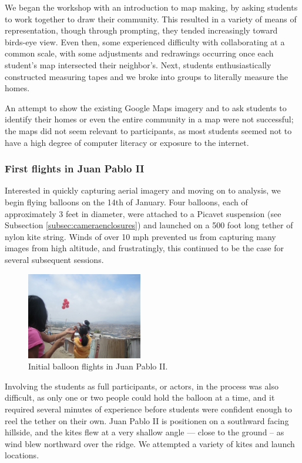 \documentclass[11pt,oneside,notitlepage]{report}
\begin{document}
We began the workshop with an introduction to map making, by asking students to work together to draw their community. This resulted in a variety of means of representation, though through prompting, they tended increasingly toward birds-eye view. Even then, some experienced difficulty with collaborating at a common scale, with some adjustments and redrawings occurring once each student's map intersected their neighbor's. Next, students enthusiastically constructed measuring tapes and we broke into groups to literally measure the homes. 

An attempt to show the existing Google Maps imagery and to ask students to identify their homes or even the entire community in a map were not successful; the maps did not seem relevant to participants, as most students seemed not to have a high degree of computer literacy or exposure to the internet. 

\subsubsection{First flights in Juan Pablo II}

Interested in quickly capturing aerial imagery and moving on to analysis, we begin flying balloons on the 14th of January. Four balloons, each of approximately 3 feet in diameter, were attached to a Picavet suspension (see Subsection \ref{subsec:cameraenclosures}) and launched on a 500 foot long tether of nylon kite string. Winds of over 10 mph prevented us from capturing many images from high altitude, and frustratingly, this continued to be the case for several subsequent sessions. 

\begin{figure}
	\begin{flushright}
		\includegraphics[width=0.45\textwidth]{images/juan-pablo-first-flight.jpg}
		\caption{Initial balloon flights in Juan Pablo II.}
	\end{flushright}
\end{figure}

Involving the students as full participants, or actors, in the process was also difficult, as only one or two people could hold the balloon at a time, and it required several minutes of experience before students were confident enough to reel the tether on their own. Juan Pablo II is positionen on a southward facing hillside, and the kites flew at a very shallow angle --- close to the ground -- as wind blew northward over the ridge. We attempted a variety of kites and launch locations. 
\end{document}
